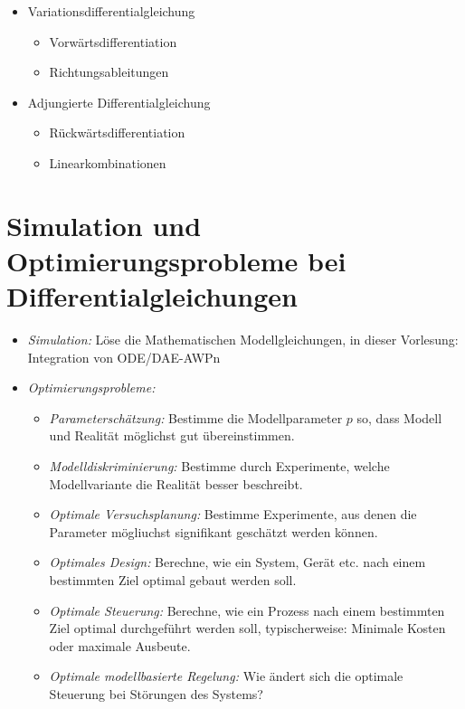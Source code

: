 \begin{itemize}
\item Variationsdifferentialgleichung
\begin{itemize}
	\item Vorwärtsdifferentiation
	\item Richtungsableitungen
\end{itemize}
\item Adjungierte Differentialgleichung
\begin{itemize}
	\item Rückwärtsdifferentiation
	\item Linearkombinationen
\end{itemize}
\end{itemize}

\section*{Simulation und Optimierungsprobleme bei Differentialgleichungen}


\begin{itemize}
\item \emph{Simulation:} Löse die Mathematischen Modellgleichungen, in dieser Vorlesung: Integration von ODE/DAE-AWPn
\item \emph{Optimierungsprobleme:}
\begin{itemize}
	\item \emph{Parameterschätzung:} Bestimme die Modellparameter $p$ so, dass Modell und Realität möglichst gut übereinstimmen.
	\item \emph{Modelldiskriminierung:} Bestimme durch Experimente, welche Modellvariante die Realität besser beschreibt.
	\item \emph{Optimale Versuchsplanung:} Bestimme Experimente, aus denen die Parameter mögliuchst signifikant geschätzt werden können.
	\item \emph{Optimales Design:} Berechne, wie ein System, Gerät etc. nach einem bestimmten Ziel optimal gebaut werden soll.
	\item \emph{Optimale Steuerung:} Berechne, wie ein Prozess nach einem bestimmten Ziel optimal durchgeführt werden soll, typischerweise: Minimale Kosten oder maximale Ausbeute.
	\item \emph{Optimale modellbasierte Regelung:} Wie ändert sich die optimale Steuerung bei Störungen des Systems?
\end{itemize}
\end{itemize}













